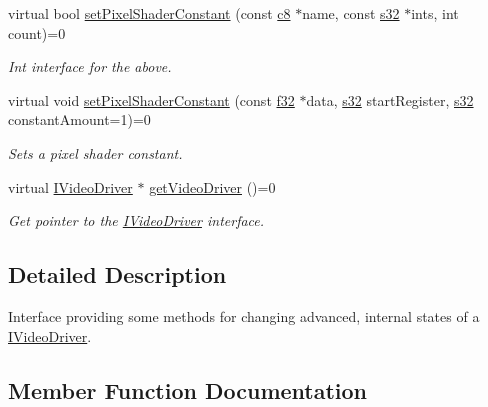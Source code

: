 \begin{DoxyCompactItemize}
\mbox{\label{classirr_1_1video_1_1IMaterialRendererServices_ac81171c7c59a9cf0fc7d76de910098f4}} 
virtual bool \hyperlink{classirr_1_1video_1_1IMaterialRendererServices_ac81171c7c59a9cf0fc7d76de910098f4}{set\+Pixel\+Shader\+Constant} (const \hyperlink{namespaceirr_a9395eaea339bcb546b319e9c96bf7410}{c8} $\ast$name, const \hyperlink{namespaceirr_ac66849b7a6ed16e30ebede579f9b47c6}{s32} $\ast$ints, int count)=0
\begin{DoxyCompactList}\small\item\em Int interface for the above. \end{DoxyCompactList}\item 
virtual void \hyperlink{classirr_1_1video_1_1IMaterialRendererServices_af962cb878f57d1edbc0030fedb464d1d}{set\+Pixel\+Shader\+Constant} (const \hyperlink{namespaceirr_a0277be98d67dc26ff93b1a6a1d086b07}{f32} $\ast$data, \hyperlink{namespaceirr_ac66849b7a6ed16e30ebede579f9b47c6}{s32} start\+Register, \hyperlink{namespaceirr_ac66849b7a6ed16e30ebede579f9b47c6}{s32} constant\+Amount=1)=0
\begin{DoxyCompactList}\small\item\em Sets a pixel shader constant. \end{DoxyCompactList}\item 
virtual \hyperlink{classirr_1_1video_1_1IVideoDriver}{I\+Video\+Driver} $\ast$ \hyperlink{classirr_1_1video_1_1IMaterialRendererServices_a2a80795887e43cb743eb5ee82604d4cf}{get\+Video\+Driver} ()=0
\begin{DoxyCompactList}\small\item\em Get pointer to the \hyperlink{classirr_1_1video_1_1IVideoDriver}{I\+Video\+Driver} interface. \end{DoxyCompactList}\end{DoxyCompactItemize}


\subsection{Detailed Description}
Interface providing some methods for changing advanced, internal states of a \hyperlink{classirr_1_1video_1_1IVideoDriver}{I\+Video\+Driver}. 

\subsection{Member Function Documentation}
\mbox{\label{classirr_1_1video_1_1IMaterialRendererServices_a2a80795887e43cb743eb5ee82604d4cf}} 
